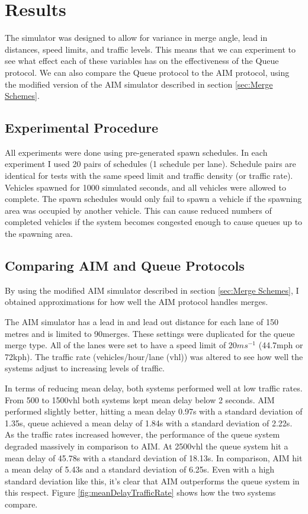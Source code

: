 \chapter{Results}
\label{cha:Results}
The simulator was designed to allow for variance in merge angle, lead in distances, speed limits, and traffic levels. This means that we can experiment to see what effect each of these variables has on the effectiveness of the Queue protocol. We can also compare the Queue protocol to the AIM protocol, using the modified version of the AIM simulator described in section \ref{sec:Merge Schemes}.

\section{Experimental Procedure}
\label{sec:Experimental Procedure}
All experiments were done using pre-generated spawn schedules. In each experiment I used 20 pairs of schedules (1 schedule per lane). Schedule pairs are identical for tests with the same speed limit and traffic density (or traffic rate). Vehicles spawned for 1000 simulated seconds, and all vehicles were allowed to complete. The spawn schedules would only fail to spawn a vehicle if the spawning area was occupied by another vehicle. This can cause reduced numbers of completed vehicles if the system becomes congested enough to cause queues up to the spawning area. 

\section{Comparing AIM and Queue Protocols}
\label{sec:Comparing AIM and Queue Protocols}
By using the modified AIM simulator described in section \ref{sec:Merge Schemes}, I obtained approximations for how well the AIM protocol handles merges.

The AIM simulator has a lead in and lead out distance for each lane of 150 metres and is limited to 90\degree merges. These settings were duplicated for the queue merge type. All of the lanes were set to have a speed limit of 20$\si{ms^{-1}}$ (44.7\si{mph} or 72\si{kph}). The traffic rate (vehicles/hour/lane (\si{vhl})) was altered to see how well the systems adjust to increasing levels of traffic.

In terms of reducing mean delay, both systems performed well at low traffic rates. From 500 to 1500\si{vhl} both systems kept mean delay below 2 seconds. AIM performed slightly better, hitting a mean delay 0.97\si{s} with a standard deviation of 1.35\si{s}, queue achieved a mean delay of 1.84\si{s} with a standard deviation of 2.22\si{s}. As the traffic rates increased however, the performance of the queue system degraded massively in comparison to AIM. At 2500\si{vhl} the queue system hit a mean delay of 45.78\si{s} with a standard deviation of 18.13\si{s}. In comparison, AIM hit a mean delay of 5.43\si{s} and a standard deviation of 6.25\si{s}. Even with a high standard deviation like this, it's clear that AIM outperforms the queue system in this respect. Figure \ref{fig:meanDelayTrafficRate} shows how the two systems compare.

